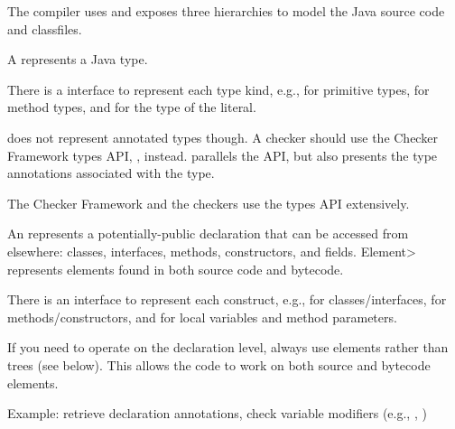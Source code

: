 
The compiler uses and exposes three hierarchies to model the Java
source code and classfiles.



A  represents a Java type.

\begin{sloppypar}
There is a  interface to represent each type kind,
e.g.,  for primitive types, 
for method types, and  for the type of the  literal.
\end{sloppypar}

 does not represent annotated types though.  A checker
should use the Checker Framework types API,
, instead.  
parallels the  API, but also presents the type annotations
associated with the type.

The Checker Framework and the checkers use the types API extensively.



An  represents a potentially-public
declaration that can be accessed from elsewhere:  classes, interfaces, methods, constructors, and
fields.  \<Element> represents elements found in both source
code and bytecode.

There is an  interface to represent each construct, e.g.,
 for classes/interfaces,  for
methods/constructors, and  for local variables and
method parameters.

If you need to operate on the declaration level, always use elements rather
than trees
(see below).  This allows the code to work on
both source and bytecode elements.

Example: retrieve declaration annotations, check variable
modifiers (e.g., , )



